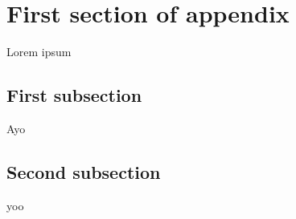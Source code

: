 \section{First section of appendix}

Lorem ipsum


\subsection{First subsection}

Ayo

\subsection{Second subsection}

yoo
